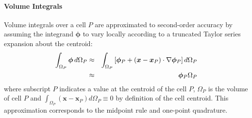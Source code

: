 \documentclass[sn-mathphys,Numbered]{sn-jnl}%
\newcommand{\bb}{\boldsymbol}
\begin{document}
\paragraph{Volume Integrals}
Volume integrals over a cell $P$ are approximated to second-order accuracy by assuming the integrand $\bb{\phi}$ to vary locally according to a truncated Taylor series expansion about the centroid:
\begin{eqnarray} \label{eq:volume_integral}
	\int_{\Omega_P} \bb{\phi} \, d \Omega_P
		&\approx& \int_{\Omega_P}  \left[ \bb{\phi}_P + (\bb{x} - \bb{x}_P) \cdot \nabla \bb{\phi}_P \right] d \Omega_P \notag \\
		&\approx& \bb{\phi}_P \Omega_P
\end{eqnarray}
where subscript $P$ indicates a value at the centroid of the cell $P$, $\Omega_P$ is the volume of cell $P$ and $\int_{\Omega_P} (\bb{x} - \bb{x}_P) d\Omega_P \equiv 0$ by definition of the cell centroid.
This approximation corresponds to the midpoint rule and one-point quadrature.


\end{document}

